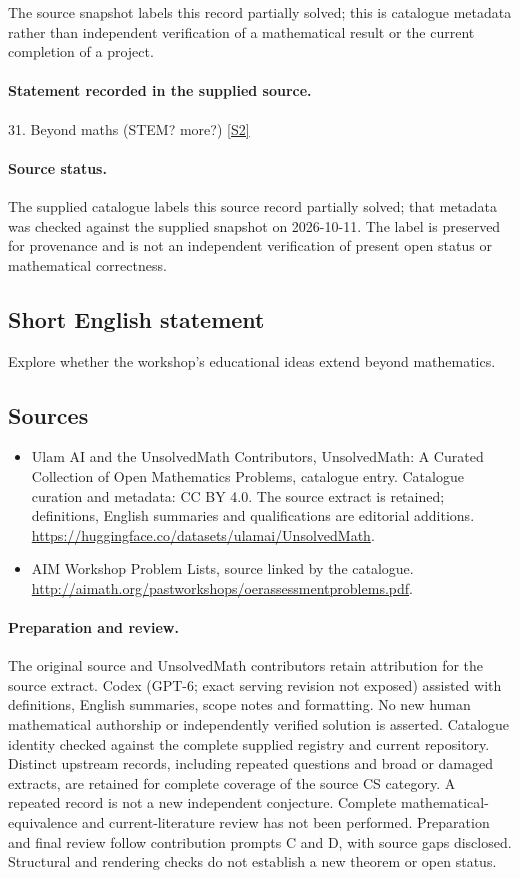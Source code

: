 \documentclass[11pt]{article}
\begin{document}
The source snapshot labels this record partially solved; this is catalogue metadata rather than independent verification of a mathematical result or the current completion of a project.
\paragraph{Statement recorded in the supplied source.}
31. Beyond maths (STEM? more?) \href{http://aimath.org/pastworkshops/oerassessmentproblems.pdf}{[S2]}
\paragraph{Source status.}
The supplied catalogue labels this source record partially solved; that metadata was checked against the supplied snapshot on 2026-10-11. The label is preserved for provenance and is not an independent verification of present open status or mathematical correctness.
\subsection{Short English statement}
Explore whether the workshop's educational ideas extend beyond mathematics.
\subsection{Sources}
\begin{itemize}
\item[S1] Ulam AI and the UnsolvedMath Contributors, UnsolvedMath: A Curated Collection of Open Mathematics Problems, catalogue entry. Catalogue curation and metadata: CC BY 4.0. The source extract is retained; definitions, English summaries and qualifications are editorial additions.
\url{https://huggingface.co/datasets/ulamai/UnsolvedMath}.
\item[S2] AIM Workshop Problem Lists, source linked by the catalogue.
\url{http://aimath.org/pastworkshops/oerassessmentproblems.pdf}.
\end{itemize}
\paragraph{Preparation and review.}
The original source and UnsolvedMath contributors retain attribution for the source extract. Codex (GPT-6; exact serving revision not exposed) assisted with definitions, English summaries, scope notes and formatting. No new human mathematical authorship or independently verified solution is asserted. Catalogue identity checked against the complete supplied registry and current repository. Distinct upstream records, including repeated questions and broad or damaged extracts, are retained for complete coverage of the source CS category. A repeated record is not a new independent conjecture. Complete mathematical-equivalence and current-literature review has not been performed. Preparation and final review follow contribution prompts C and D, with source gaps disclosed. Structural and rendering checks do not establish a new theorem or open status.
\label{end:statement}
\end{document}
